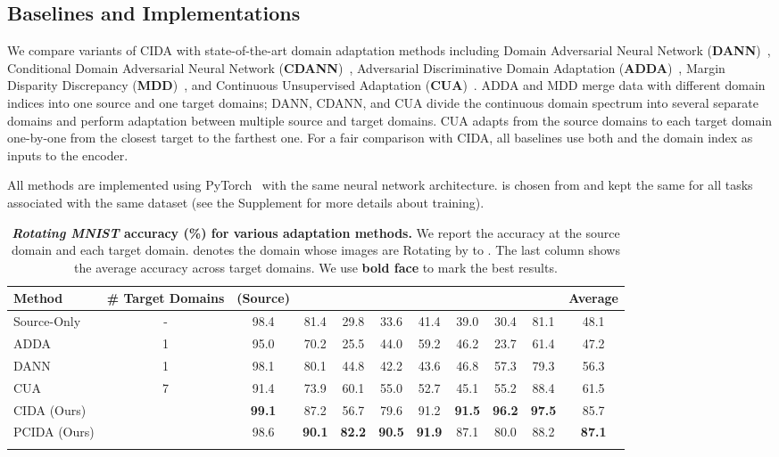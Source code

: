 \documentclass{article}
\begin{document}
\subsection{Baselines and Implementations}
We compare variants of CIDA with state-of-the-art domain adaptation methods including Domain Adversarial Neural Network (\textbf{DANN})~\cite{DANN}, Conditional Domain Adversarial Neural Network (\textbf{CDANN})~\cite{CDANN}, Adversarial Discriminative Domain Adaptation
(\textbf{ADDA})~\cite{ADDA}, Margin Disparity
Discrepancy (\textbf{MDD})~\cite{MDD}, and Continuous Unsupervised Adaptation (\textbf{CUA})~\cite{CUA}.
ADDA and MDD merge data with different domain indices into one source and one target domains; DANN, CDANN, and CUA divide the continuous domain spectrum into several separate domains and perform adaptation between multiple source and target domains. CUA adapts from the source domains to each target domain one-by-one from the closest target to the farthest one.
For a fair comparison with CIDA, all baselines use both  and the domain index  as inputs to the encoder.


All methods are implemented using PyTorch~\cite{PyTorch} with the same neural network architecture.  is chosen from  and kept the same for all tasks associated with the same dataset (see the Supplement for more details about training).



\begin{table*}[!t]
\begin{footnotesize}
\vskip -0.3cm
\begin{center}
\caption{ \textbf{\emph{Rotating MNIST} accuracy (\%) for various adaptation methods.} We report the accuracy at the source domain and each target domain.  denotes the domain whose images are Rotating by  to . The last column shows the average accuracy across target domains. We use \textbf{bold face} to mark the best results.}
\label{tab:mnist}
\vspace{1mm}
\begin{tabular}{lcccccccccc}
\hline
Method & \# Target Domains &  (Source) &  &  &  &  &  &  &  & Average \\
\hline
Source-Only & - & 98.4 & 81.4 & 29.8 & 33.6 & 41.4 & 39.0 & 30.4 & 81.1 & 48.1 \\
ADDA        & 1 & 95.0 & 70.2 & 25.5 & 44.0 & 59.2 & 46.2 & 23.7 & 61.4 & 47.2 \\
DANN        & 1 & 98.1 & 80.1 & 44.8 & 42.2 & 43.6 & 46.8 & 57.3 & 79.3 & 56.3 \\
CUA         & 7 & 91.4 & 73.9 & 60.1 & 55.0 & 52.7 & 45.1 & 55.2 & 88.4 & 61.5 \\
CIDA (Ours) &  & \textbf{99.1} & 87.2 & 56.7 & 79.6 & 91.2 & \textbf{91.5} & \textbf{96.2} & \textbf{97.5} & 85.7 \\
PCIDA (Ours) &  & 98.6 & \textbf{90.1} & \textbf{82.2} & \textbf{90.5} & \textbf{91.9} & 87.1 & 80.0 & 88.2 & \textbf{87.1} \\
\hline
 \vspace{-10mm}
\end{tabular}
\end{center}
\end{footnotesize}
\end{table*}
\end{document}
